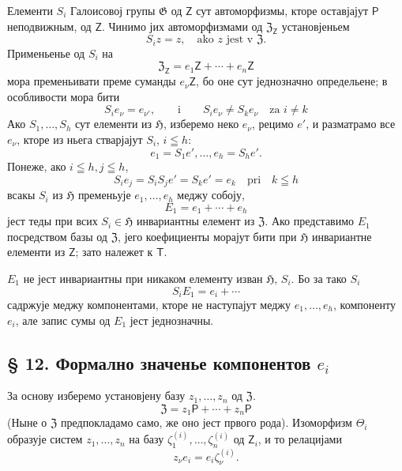 \documentclass[11pt]{article}
\begin{document}
Елементи \(S_i\) Галоисовој групы \(\mathfrak G\) од \(\mathsf Z\) сут автоморфизмы, кторе оставјајут \(\mathsf P\) неподвижным, од \(\mathsf Z\). Чинимо јих автоморфизмами од \(\mathfrak Z_{\mathsf Z}\) установјеньем
\[
S_i z=z,\quad \text{ako } z \text{ jest v } \mathfrak Z.
\]
Применьенье од \(S_i\) на
\[
\mathfrak Z_{\mathsf Z}=e_1\mathsf Z+\cdots+e_n\mathsf Z
\]
мора пременьивати преме суманды \(e_\nu\mathsf Z\), бо оне сут једнозначно определьене; в особливости мора бити
\[
S_i e_\nu=e_{\nu'},\qquad\text{i}\qquad S_i e_\nu\ne S_k e_\nu
\quad\text{za } i\ne k
\]
Ако \(S_1,\ldots,S_h\) сут елементи из \(\mathfrak H\), изберемо неко \(e_\nu\), рецимо \(e'\), и разматрамо все \(e_\nu\), кторе из ньега стварјајут \(S_i\), \(i\leqq h\):
\[
e_1=S_1e',\ldots,e_h=S_he'.
\]
Понеже, ако \(i\leqq h, j\leqq h\),
\[
S_i e_j=S_iS_j e'=S_ke'=e_k \quad \text{pri}\quad k\leqq h
\]
всакы \(S_i\) из \(\mathfrak H\) пременьује \(e_1,\ldots,e_h\) меджу собоју,
\[
E_1=e_1+\cdots+e_h
\]
јест теды при всих \(S_i\in\mathfrak H\) инвариантны елемент из \(\mathfrak Z\). Ако представимо \(E_1\) посредством базы од \(\mathfrak Z\), јего коефициенты морајут бити при \(\mathfrak H\) инвариантне елементи из \(\mathsf Z\); зато належет к \(\mathsf T\).

\(E_1\) не јест инвариантны при никаком елементу изван \(\mathfrak H\), \(S_i\). Бо за тако \(S_i\)
\[
S_i E_1=e_i+\cdots
\]
садржује меджу компонентами, кторе не наступајут меджу \(e_1,\ldots,e_h\), компоненту \(e_i\), але запис сумы од \(E_1\) јест једнозначны.

\subsection*{§ 12. Формално значенье компонентов \(e_i\)}\label{die-formale-bedeutung-der-komponenten-ei}

За основу изберемо установјену базу \(z_1,\ldots,z_n\) од \(\mathfrak Z\).
\[
\mathfrak Z=z_1\mathsf P+\cdots+z_n\mathsf P
\]
(Ныне о \(\mathfrak Z\) предпокладамо само, же оно јест првого рода). Изоморфизм \(\Theta_i\) образује систем \(z_1,\ldots,z_n\) на базу \(\zeta_1^{(i)},\ldots,\zeta_n^{(i)}\) од \(\mathsf Z_i\), и то релацијами
\[
z_\nu e_i=e_i\zeta_\nu^{(i)} .
\]
\end{document}
